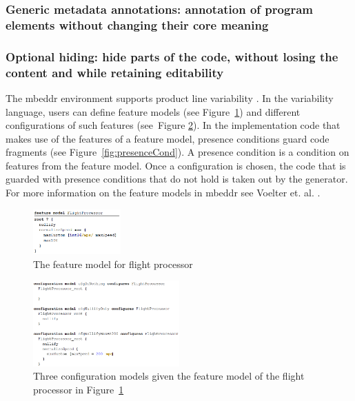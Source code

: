\documentclass[preprint,numbers,10pt]{sigplanconf}
\begin{document}
\subsubsection{Generic metadata annotations: annotation of program elements without changing their core meaning}
\subsubsection{Optional hiding: hide parts of the code, without losing the content and while retaining editability}
\label{sec:OptHiding}
The mbeddr environment supports product line variability \cite{voelter2015using}. In the variability language, users can define
feature models (see Figure~\ref{fig:featureModel}) and
different configurations of such features (see~Figure \ref{fig:configs}).
In the implementation code that makes use of the features of a feature model, presence conditions guard
code fragments (see Figure~\ref{fig:presenceCond}). A presence condition is a condition on features from the feature model. 
Once a configuration is chosen, the code that is guarded with presence conditions that do not hold is taken out by the generator.
For more information on the feature models in mbeddr see Voelter et. al. \cite{voelter2013mbeddr}.

\begin{figure}[H]
	\centering
	\includegraphics[width=0.30\textwidth]{screens/FeatureModelFlightProcessor.png}
	\caption{The feature model for flight processor}
	\label{fig:featureModel}
\end{figure}

\begin{figure}[H]
	\centering
	\includegraphics[width=0.50\textwidth]{screens/ConfigurationModels}
	\caption{Three configuration models given the feature model of the flight processor in Figure~\ref{fig:featureModel}}
	\label{fig:configs}
\end{figure}
\end{document}

